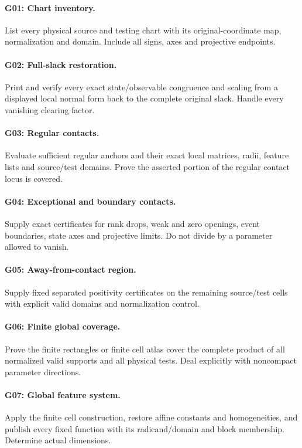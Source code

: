 \paragraph{G01: Chart inventory.} List every physical source and testing chart with its original-coordinate map, normalization and domain. Include all signs, axes and projective endpoints.
\paragraph{G02: Full-slack restoration.} Print and verify every exact state/observable congruence and scaling from a displayed local normal form back to the complete original slack. Handle every vanishing clearing factor.
\paragraph{G03: Regular contacts.} Evaluate sufficient regular anchors and their exact local matrices, radii, feature lists and source/test domains. Prove the asserted portion of the regular contact locus is covered.
\paragraph{G04: Exceptional and boundary contacts.} Supply exact certificates for rank drops, weak and zero openings, event boundaries, state axes and projective limits. Do not divide by a parameter allowed to vanish.
\paragraph{G05: Away-from-contact region.} Supply fixed separated positivity certificates on the remaining source/test cells with explicit valid domains and normalization control.
\paragraph{G06: Finite global coverage.} Prove the finite rectangles or finite cell atlas cover the complete product of all normalized valid supports and all physical tests. Deal explicitly with noncompact parameter directions.
\paragraph{G07: Global feature system.} Apply the finite cell construction, restore affine constants and homogeneities, and publish every fixed function with its radicand/domain and block membership. Determine actual dimensions.
